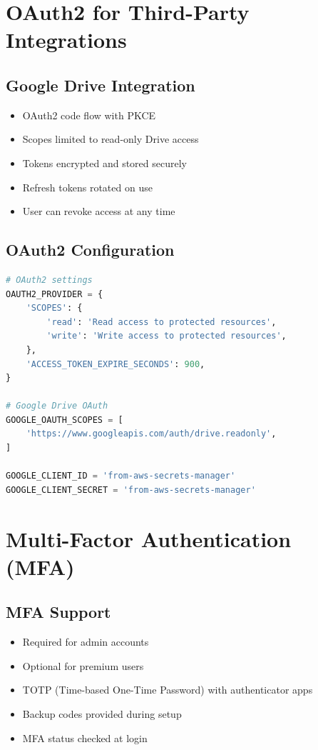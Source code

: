 \documentclass{report}
\begin{document}
\section{OAuth2 for Third-Party Integrations}

\subsection{Google Drive Integration}
\begin{itemize}
\item OAuth2 code flow with PKCE
\item Scopes limited to read-only Drive access
\item Tokens encrypted and stored securely
\item Refresh tokens rotated on use
\item User can revoke access at any time
\end{itemize}

\subsection{OAuth2 Configuration}
\begin{lstlisting}[language=Python]
# OAuth2 settings
OAUTH2_PROVIDER = {
    'SCOPES': {
        'read': 'Read access to protected resources',
        'write': 'Write access to protected resources',
    },
    'ACCESS_TOKEN_EXPIRE_SECONDS': 900,
}

# Google Drive OAuth
GOOGLE_OAUTH_SCOPES = [
    'https://www.googleapis.com/auth/drive.readonly',
]

GOOGLE_CLIENT_ID = 'from-aws-secrets-manager'
GOOGLE_CLIENT_SECRET = 'from-aws-secrets-manager'
\end{lstlisting}

\section{Multi-Factor Authentication (MFA)}

\subsection{MFA Support}
\begin{itemize}
\item Required for admin accounts
\item Optional for premium users
\item TOTP (Time-based One-Time Password) with authenticator apps
\item Backup codes provided during setup
\item MFA status checked at login
\end{itemize}
\end{document}
